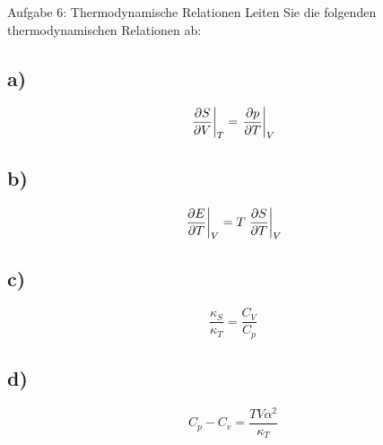 \begin{aufgabe}{Aufgabe 6: Thermodynamische Relationen}
    Leiten Sie die folgenden thermodynamischen Relationen ab:
    \subsection{a)}
    \[
        \left.\frac{\partial S}{\partial V}\right\rvert_{T} = \left.\frac{\partial p}{\partial T}\right\rvert_{V}
    \]

    \subsection{b)}
    \[
        \left.\frac{\partial E}{\partial T}\right\rvert_{V} = T \left.\frac{\partial S}{\partial T}\right\rvert_{V}
    \]

    \subsection{c)}
    \[
        \frac{\kappa_S}{\kappa_T} = \frac{C_V}{C_p}
    \]

    \subsection{d)}
    \[
        C_p - C_v = \frac{T V \alpha^2}{\kappa_T}
    \]
\end{aufgabe}


